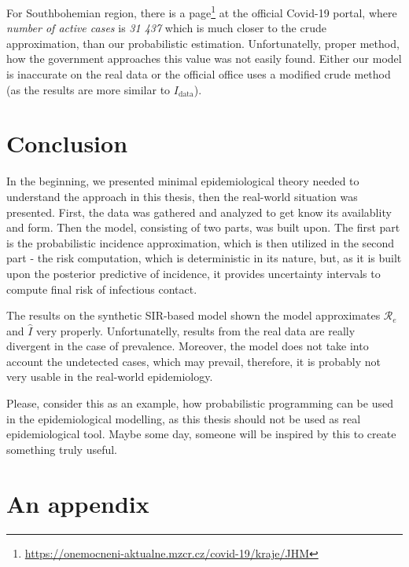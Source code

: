 \documentclass[
  digital, %
  oneside, %
  lof,     %
  lot,     %
]{fithesis4}
\begin{document}
For Southbohemian region,
there is a page\footnote{\url{https://onemocneni-aktualne.mzcr.cz/covid-19/kraje/JHM}}
at the official Covid-19 portal, where 
\textit{number of active cases} is \textit{31 437} which 
is much closer to the crude approximation, than 
our probabilistic estimation.
Unfortunatelly, proper method, how the government 
approaches this value was not easily found.
Either our model is inaccurate on the real data or 
the official office uses a modified crude 
method (as the results are more similar to $I_\text{data}$).


\chapter{Conclusion}

In the beginning, we presented minimal 
epidemiological theory needed to understand the approach
in this thesis, then the real-world situation was 
presented. First, the data was gathered and analyzed to
get know its availablity and form.
Then the model, consisting of two parts, was built upon.
The first part is the probabilistic incidence approximation, 
which is then utilized in the second part - the risk
computation, which is deterministic in its nature, but,
as it is built upon the posterior predictive of incidence,
it provides uncertainty intervals to compute final risk of
infectious contact.

The results on the synthetic SIR-based model shown
the model approximates $\mathcal{R}_e$ and $\hat{I}$ very properly.
Unfortunatelly, results from the real data are 
really divergent in the case of prevalence.
Moreover, the model does not take into account the
undetected cases, which may prevail, therefore,
it is probably not very usable 
in the real-world epidemiology.

Please, consider this as an example, how probabilistic
programming can be used in the epidemiological modelling, as this
thesis should not be used as real epidemiological tool.
Maybe some day, someone will be inspired by this to 
create something truly useful.


\printbibliography[heading=bibintoc]

\appendix

\chapter{An appendix}



\end{document}
